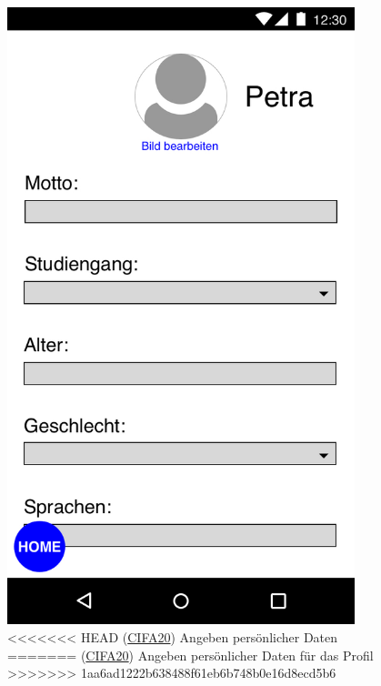 \documentclass[a4paper]{scrreprt}
\begin{document}
\begin{figure}[H]
	\centering 
	\begin{minipage}[b]{0.48\textwidth} 
		\centering 
		\includegraphics[width=0.9\textwidth]{res/GUI/03.jpeg} 
		\label{Fig.3}
<<<<<<< HEAD
		(\hyperlink{cifa20}{CIFA20}) Angeben persönlicher Daten
=======
		(\hyperlink{cifa20}{CIFA20}) Angeben persönlicher Daten für das Profil
>>>>>>> 1aa6ad1222b638488f61eb6b748b0e16d8ecd5b6
	\end{minipage}
	\begin{minipage}[b]{0.48\textwidth} 
		\centering 

\end{minipage}
\end{figure}
\end{document}
